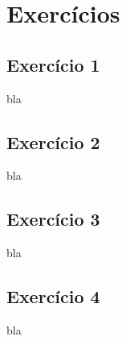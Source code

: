 \chapter{Exercícios}
\label{ape:exercicios}

\section{Exercício 1}

bla 

\section{Exercício 2}

bla

\section{Exercício 3}

bla

\section{Exercício 4}

bla